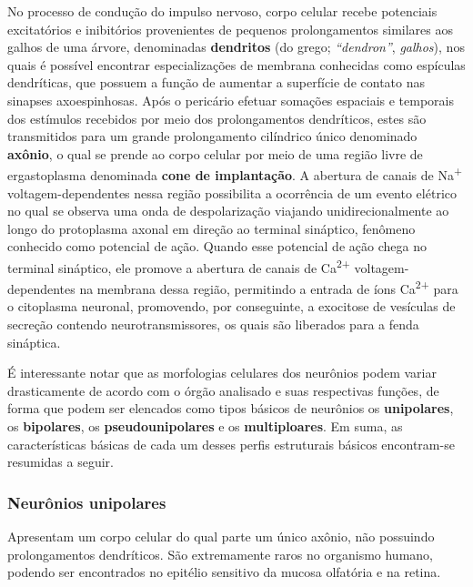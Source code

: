 \documentclass[
]{book}
\theoremstyle{definition}
\theoremstyle{definition}
\theoremstyle{definition}
\theoremstyle{definition}
\theoremstyle{remark}
\begin{document}
No processo de condução do impulso nervoso, corpo celular recebe potenciais excitatórios e inibitórios provenientes de pequenos prolongamentos similares aos galhos de uma árvore, denominadas \textbf{dendritos} (do grego; \emph{``dendron''}, \emph{galhos}), nos quais é possível encontrar especializações de membrana conhecidas como espículas dendríticas, que possuem a função de aumentar a superfície de contato nas sinapses axoespinhosas. Após o pericário efetuar somações espaciais e temporais dos estímulos recebidos por meio dos prolongamentos dendríticos, estes são transmitidos para um grande prolongamento cilíndrico único denominado \textbf{axônio}, o qual se prende ao corpo celular por meio de uma região livre de ergastoplasma denominada \textbf{cone de implantação}. A abertura de canais de Na\textsuperscript{+} voltagem-dependentes nessa região possibilita a ocorrência de um evento elétrico no qual se observa uma onda de despolarização viajando unidirecionalmente ao longo do protoplasma axonal em direção ao terminal sináptico, fenômeno conhecido como potencial de ação. Quando esse potencial de ação chega no terminal sináptico, ele promove a abertura de canais de Ca\textsuperscript{2+} voltagem-dependentes na membrana dessa região, permitindo a entrada de íons Ca\textsuperscript{2+} para o citoplasma neuronal, promovendo, por conseguinte, a exocitose de vesículas de secreção contendo neurotransmissores, os quais são liberados para a fenda sináptica.

É interessante notar que as morfologias celulares dos neurônios podem variar drasticamente de acordo com o órgão analisado e suas respectivas funções, de forma que podem ser elencados como tipos básicos de neurônios os \textbf{unipolares}, os \textbf{bipolares}, os \textbf{pseudounipolares} e os \textbf{multiploares}. Em suma, as características básicas de cada um desses perfis estruturais básicos encontram-se resumidas a seguir.

\hypertarget{neuruxf4nios-unipolares}{%
\subsubsection*{Neurônios unipolares}\label{neuruxf4nios-unipolares}}

Apresentam um corpo celular do qual parte um único axônio, não possuindo prolongamentos dendríticos. São extremamente raros no organismo humano, podendo ser encontrados no epitélio sensitivo da mucosa olfatória e na retina.
\end{document}
